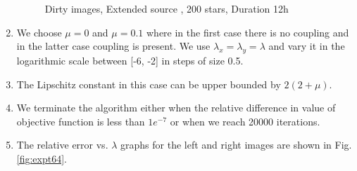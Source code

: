 \begin{enumerate}
\begin{figure}[h!]
\hspace{0.4in}
		\hspace{0.2in}
\caption [Dirty images, Extended source, 200 stars, Duration 12h]{Dirty images, Extended source , 200 stars, Duration 12h}
\label{fig:expt63}
\end{figure}


\item We choose $\mu = 0$ and $\mu = 0.1$ where in the first case there is no coupling and in the latter case coupling is present. We use $\lambda_x = \lambda_y = \lambda$ and vary it in the logarithmic scale between [-6, -2] in steps of size 0.5. 
\item The Lipschitz constant in this case can be upper bounded by $2(2 + \mu)$.
\item We terminate the algorithm either when the relative difference in value of objective function is less than $1e^{-7}$ or when we reach 20000 iterations.
\item The relative error vs.  $\lambda$ graphs for the left and right images are shown in Fig. \ref{fig:expt64}.


\end{enumerate}
